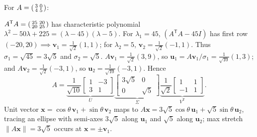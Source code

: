 \documentclass[10pt]{scrartcl}
\newcommand{\vv}[1]{\mathbf{#1}}
\begin{document}
\revisit For $A=\begin{psmallmatrix}3&0\\4&5\end{psmallmatrix}$:
\begin{steps}
  \ii $A^{\mathsf T}A=\begin{psmallmatrix}25&20\\20&25\end{psmallmatrix}$ has characteristic polynomial $\lambda^2-50\lambda+225=(\lambda-45)(\lambda-5)$.
  \ii For $\lambda_1=45$, $(A^{\mathsf T}A-45I)$ has first row $(-20,20)\implies\vv v_1=\frac{1}{\sqrt{2}}(1,1)$; for $\lambda_2=5$, $\vv v_2=\frac{1}{\sqrt{2}}(-1,1)$. Thus $\sigma_1=\sqrt{45}=3\sqrt{5}$ and $\sigma_2=\sqrt{5}$.
  \ii $A\vv v_1=\frac{1}{\sqrt{2}}(3,9)$, so $\vv u_1=A\vv v_1/\sigma_1=\frac{1}{\sqrt{10}}(1,3)$; and $A\vv v_2=\frac{1}{\sqrt{2}}(-3,1)$, so $\vv u_2=\frac{1}{\sqrt{10}}(-3,1)$. Hence
  \[
    A = \underbrace{\frac{1}{\sqrt{10}}\begin{bmatrix}1&-3\\3&1\end{bmatrix}}_{U}
        \underbrace{\begin{bmatrix}3\sqrt{5}&0\\0&\sqrt{5}\end{bmatrix}}_{\Sigma}
        \underbrace{\frac{1}{\sqrt{2}}\begin{bmatrix}1&1\\-1&1\end{bmatrix}}_{V^{\mathsf T}}.
  \]
  Unit vector $\vv x=\cos\theta\,\vv v_1+\sin\theta\,\vv v_2$ maps to $A\vv x=3\sqrt{5}\cos\theta\,\vv u_1+\sqrt{5}\sin\theta\,\vv u_2$, tracing an ellipse with semi-axes $3\sqrt{5}$ along $\vv u_1$ and $\sqrt{5}$ along $\vv u_2$; max stretch $\|A\vv x\|=3\sqrt{5}$ occurs at $\vv x=\pm\vv v_1$.
\end{steps}
\end{document}
